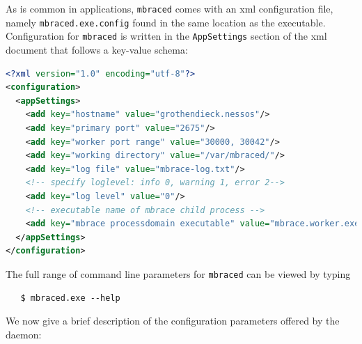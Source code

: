 As is common in \dotnet{} applications, \texttt{mbraced} comes with an xml
configuration file, namely \texttt{mbraced.exe.config} found in the same location 
as the executable. Configuration for \texttt{mbraced} is written in the 
\texttt{AppSettings} section of the xml document that follows a key-value 
schema:
\begin{lstlisting}[language=Xml]
<?xml version="1.0" encoding="utf-8"?>
<configuration>
  <appSettings>
    <add key="hostname" value="grothendieck.nessos"/>
    <add key="primary port" value="2675"/>
    <add key="worker port range" value="30000, 30042"/>
    <add key="working directory" value="/var/mbraced/"/>
    <add key="log file" value="mbrace-log.txt"/>
    <!-- specify loglevel: info 0, warning 1, error 2-->
    <add key="log level" value="0"/>
    <!-- executable name of mbrace child process -->
    <add key="mbrace processdomain executable" value="mbrace.worker.exe"/>
  </appSettings>
</configuration>
\end{lstlisting}
The full range of command line parameters for \texttt{mbraced} can be viewed by typing
\begin{verbatim}
   $ mbraced.exe --help
\end{verbatim}
%
We now give a brief description of the configuration parameters offered by the daemon:
